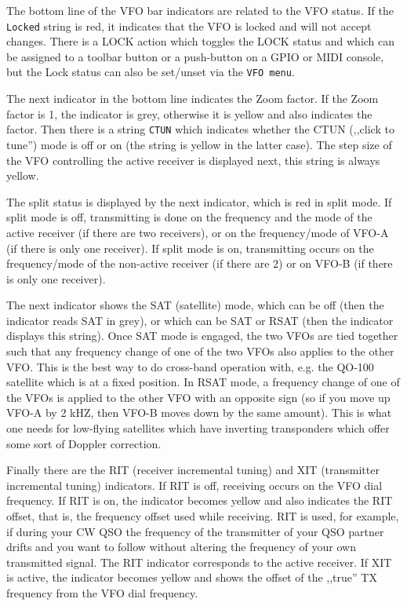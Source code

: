 \documentclass[12pt]{book}
\begin{document}
 The bottom line of the VFO bar  indicators are related to the VFO status.
 If the \texttt{Locked} string is red, it indicates that the VFO is locked
 and will not accept changes. There is a LOCK action which toggles the
 LOCK status and which can be assigned to a toolbar button or a push-button
 on a GPIO or MIDI console, but the Lock status can also be set/unset
 via the \texttt{VFO menu}.
 
The next indicator in the bottom  line indicates the Zoom factor. If the
Zoom factor is 1, the indicator is grey, otherwise it is yellow and
also indicates the factor. Then there is a string \texttt{CTUN} which
indicates whether the CTUN (,,click to tune'') mode is off or on (the string 
is yellow in the latter case). The step size of the VFO controlling the
active receiver is displayed next, this string is always yellow.

The split status is displayed by the next indicator, which is red in
split mode. If split mode is off, transmitting is done on the frequency
and the mode of the active receiver (if there are two receivers), or
on the frequency/mode of VFO-A (if there is only one receiver). If
split mode is on, transmitting occurs on the frequency/mode of the
non-active receiver (if there are 2) or on VFO-B (if there is only  one
receiver).

The next indicator shows the SAT (satellite) mode, which can be off
(then the indicator reads SAT in grey), or which can be SAT or RSAT
(then the indicator displays this  string). Once SAT mode is engaged,
the two VFOs are tied together such that any frequency change of one
of the two VFOs also applies to the other VFO. This is the best way
to do cross-band operation with, e.g. the QO-100 satellite which is at
a fixed position. In RSAT mode, a frequency change of one of the VFOs
is applied to the other VFO with an opposite sign (so if you move up
VFO-A by 2 kHZ, then VFO-B moves down by the same amount). This is
what one needs for low-flying satellites which have inverting
transponders which offer some sort of Doppler correction.

Finally there are the RIT (receiver incremental tuning) and XIT
(transmitter incremental tuning) indicators. If RIT is off,
receiving occurs on the VFO dial frequency. If RIT is on, the 
indicator becomes yellow and also indicates the RIT offset, that is,
the frequency offset used while receiving. RIT is used, for example,
if during your CW QSO the frequency of the transmitter of your
QSO partner drifts and you want to follow without altering the
frequency of your own transmitted signal. The RIT indicator
corresponds to the active receiver. If XIT is active, the
indicator becomes yellow and shows the offset of the ,,true''
TX frequency from the VFO dial frequency. 
\end{document}
